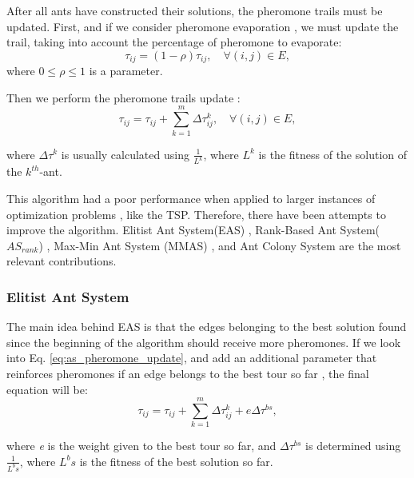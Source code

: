 					After all ants have constructed their solutions, the pheromone trails must be updated. First, and if we consider pheromone evaporation \cite{dorigo96}, we must update the trail, taking into account the percentage of pheromone to evaporate:
					\begin{equation}
						\tau_{ij} = (1 - \rho)\tau_{ij}, \quad \forall(i,j)\in E,
					\end{equation}
		\noindent where $0 \leq \rho \leq 1$ is a parameter.

					Then we perform the  pheromone trails update \cite{dorigo96}:
					\begin{equation}
						\label{eq:as_pheromone_update}
						\tau_{ij} = \tau_{ij} + \sum_{k=1}^{m}\Delta\tau_{ij}^k, \quad \forall(i,j)\in E,
					\end{equation}


		\noindent where $\Delta\tau^k$ is usually calculated using $\frac{1} {L^k}$, where $L^k$ is the fitness of the solution of the $k^{th}$-ant.

					This algorithm had a poor performance when applied to larger instances of optimization problems \cite{acobook}, like the TSP. Therefore, there have been attempts to improve the algorithm. Elitist Ant System(EAS) \cite{dorigo92} \cite{dorigo96}, Rank-Based Ant System($AS_{rank}$) \cite{bullnheimer97}, Max-Min Ant System (MMAS) \cite{stutzle00}, and Ant Colony System \cite{dorigo97} are the most relevant contributions.

					\subsubsection*{Elitist Ant System}

					The main idea behind EAS \cite{dorigo92, dorigo96} is that the edges belonging to the best solution found since the beginning of the algorithm should receive more pheromones. If we look into Eq. \eqref{eq:as_pheromone_update}, and add an additional parameter that reinforces pheromones if an edge belongs to the best tour so far \cite{dorigo92, dorigo96}, the final equation will be:
					\begin{equation}
						\label{eq:eas_pheromone_update}
						\tau_{ij} = \tau_{ij} + \sum_{k=1}^{m}\Delta\tau_{ij}^k + e\Delta\tau^{bs},
					\end{equation}

		\noindent where \emph{e} is the weight given to the best tour so far, and $\Delta\tau^{bs}$ is determined using $\frac{1} {L^bs}$, where ${L^bs}$ is the fitness of the best solution so far. 

